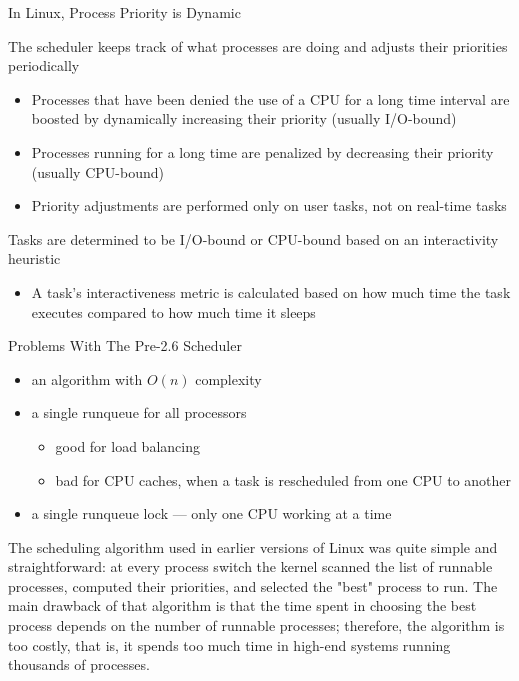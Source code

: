 \begin{frame}{In Linux, Process Priority is Dynamic}
    \begin{block}{The scheduler keeps track of what processes are doing and adjusts their
      priorities periodically}
    \begin{itemize}
    \item Processes that have been denied the use of a CPU for a long time interval are boosted by
      dynamically increasing their priority (usually I/O-bound)
    \item Processes running for a long time are penalized by decreasing their priority (usually CPU-bound)
    \item Priority adjustments are performed only on user tasks, not on real-time tasks
    \end{itemize}
  \end{block}
  \begin{block}{Tasks are determined to be I/O-bound or CPU-bound based on an interactivity
      heuristic}
    \begin{itemize}
    \item[] A task's interactiveness metric is calculated based on how much time the task executes
      compared to how much time it sleeps
    \end{itemize}
  \end{block}
\end{frame}

\begin{frame}{Problems With The Pre-2.6 Scheduler}
  \begin{itemize}
  \item[😐] an algorithm with $O(n)$ complexity
  \item a single runqueue for all processors
    \begin{itemize}
    \item[🙂] good for load balancing
    \item[\textcolor{red}{🙁}] bad for CPU caches, when a task is
      rescheduled from one CPU to another
    \end{itemize}
  \item[😐] a single runqueue lock --- only one CPU working at a time
  \end{itemize}
\end{frame}

The scheduling algorithm used in earlier versions of Linux was quite simple and
straightforward: at every process switch the kernel scanned the list of runnable
processes, computed their priorities, and selected the "best" process to run. The main
drawback of that algorithm is that the time spent in choosing the best process depends on
the number of runnable processes; therefore, the algorithm is too costly, that is, it
spends too much time in high-end systems running thousands of processes.

